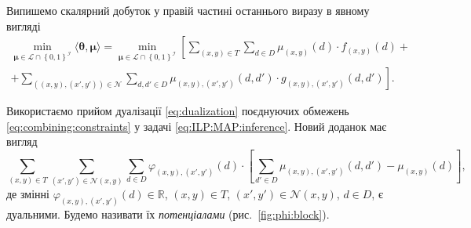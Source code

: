 Випишемо скалярний добуток у правій частині останнього виразу в явному вигляді
\begin{equation} \label{eq:ILP:MAP:inference}
\begin{gathered}
    \min \limits_{\pmb{\mu} \in \mathcal{L} \cap \left\{ 0, 1 \right\}^{\mathcal{I}}}
        \langle \pmb{\theta}, \pmb{\mu} \rangle =
    \min \limits_{\pmb{\mu} \in \mathcal{L} \cap \left\{ 0, 1 \right\}^{\mathcal{I}}}
        \left[
            \sum \limits_{\left(x, y \right) \in T}
                \sum \limits_{d \in D}
                    \mu_{\left(x, y \right)} \left(d \right) \cdot
                    f_{\left(x, y \right)} \left( d \right) + \right. \\
            + \left.
            \sum \limits_{\left(\left(x, y \right), \left(x', y' \right) \right) \in \mathcal{N}}
                \sum \limits_{d, d' \in D}
                    \mu_{\left(x, y \right), \left(x', y' \right)} \left(
                        d, d'
                    \right) \cdot
                    g_{\left(x, y \right), \left(x', y' \right)} \left(
                        d, d'
                    \right)
        \right].
\end{gathered}
\end{equation}

Використаємо прийом дуалізації \eqref{eq:dualization}
поєднуючих обмежень \eqref{eq:combining:constraints}
у задачі \eqref{eq:ILP:MAP:inference}.
Новий доданок має вигляд
\begin{equation} \label{eq:dualized:term}
    \sum \limits_{\left(x, y \right) \in T}
        \sum \limits_{\left(x', y' \right) \in \mathcal{N} \left(x, y \right)}
            \sum \limits_{d \in D}
                \varphi_{\left(x, y \right), \left(x', y' \right)} \left(
                    d
                \right) \cdot \left[
                    \sum \limits_{d' \in D}
                        \mu_{\left(x, y \right), \left(x', y' \right)} \left(
                            d, d'
                        \right) - \mu_{\left(x, y \right)} \left(d \right)
                \right],
\end{equation}
де змінні
$\varphi_{\left(x, y \right), \left(x', y' \right)} \left( d \right) \in
    \mathbb{R}$,
$\left(x, y \right) \in T$,
$\left(x', y' \right) \in \mathcal{N} \left(x, y \right)$,
$d \in D$,
є дуальними.
Будемо називати їх \textit{потенціалами} (рис.~\ref{fig:phi:block}).

